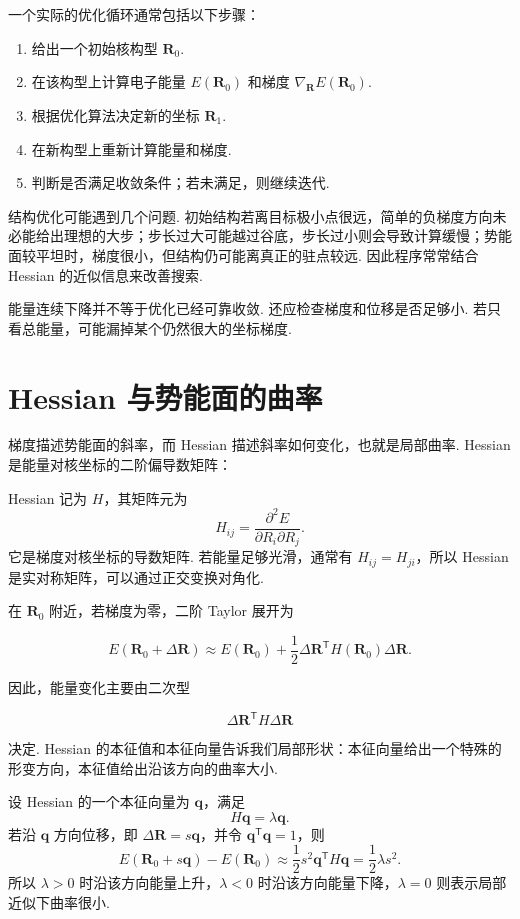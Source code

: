 \documentclass[UTF8,11pt,a4paper,openany]{ctexbook}
\begin{document}
一个实际的优化循环通常包括以下步骤：

\begin{enumerate}
\item 给出一个初始核构型 $\mathbf R_0$. 
\item 在该构型上计算电子能量 $E(\mathbf R_0)$ 和梯度 $\nabla_{\mathbf R}E(\mathbf R_0)$. 
\item 根据优化算法决定新的坐标 $\mathbf R_1$. 
\item 在新构型上重新计算能量和梯度. 
\item 判断是否满足收敛条件；若未满足，则继续迭代. 
\end{enumerate}

结构优化可能遇到几个问题. 初始结构若离目标极小点很远，简单的负梯度方向未必能给出理想的大步；步长过大可能越过谷底，步长过小则会导致计算缓慢；势能面较平坦时，梯度很小，但结构仍可能离真正的驻点较远. 因此程序常常结合 Hessian 的近似信息来改善搜索. 

\begin{limitbox}
能量连续下降并不等于优化已经可靠收敛. 还应检查梯度和位移是否足够小. 若只看总能量，可能漏掉某个仍然很大的坐标梯度. 
\end{limitbox}

\section{Hessian 与势能面的曲率}

梯度描述势能面的斜率，而 Hessian 描述斜率如何变化，也就是局部曲率. Hessian 是能量对核坐标的二阶偏导数矩阵：

\begin{notationbox}
Hessian 记为 $H$，其矩阵元为
\[
H_{ij}
=
\frac{\partial^2E}
{\partial R_i\partial R_j}.
\]
它是梯度对核坐标的导数矩阵. 若能量足够光滑，通常有 $H_{ij}=H_{ji}$，所以 Hessian 是实对称矩阵，可以通过正交变换对角化. 
\end{notationbox}

在 $\mathbf R_0$ 附近，若梯度为零，二阶 Taylor 展开为

\[
E(\mathbf R_0+\Delta\mathbf R)
\approx
E(\mathbf R_0)
+
\frac12
\Delta\mathbf R^{\mathsf T}
H(\mathbf R_0)
\Delta\mathbf R.
\]

因此，能量变化主要由二次型

\[
\Delta\mathbf R^{\mathsf T}H\Delta\mathbf R
\]

决定. Hessian 的本征值和本征向量告诉我们局部形状：本征向量给出一个特殊的形变方向，本征值给出沿该方向的曲率大小. 

\begin{derivationbox}
设 Hessian 的一个本征向量为 $\mathbf q$，满足
\[
H\mathbf q=\lambda\mathbf q.
\]
若沿 $\mathbf q$ 方向位移，即 $\Delta\mathbf R=s\mathbf q$，并令 $\mathbf q^{\mathsf T}\mathbf q=1$，则
\[
E(\mathbf R_0+s\mathbf q)-E(\mathbf R_0)
\approx
\frac12s^2\mathbf q^{\mathsf T}H\mathbf q
=
\frac12\lambda s^2.
\]
所以 $\lambda>0$ 时沿该方向能量上升，$\lambda<0$ 时沿该方向能量下降，$\lambda=0$ 则表示局部近似下曲率很小. 
\end{derivationbox}
\end{document}
